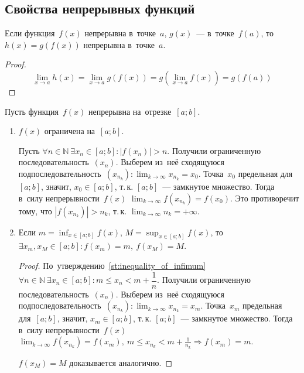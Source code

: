\subsection{Свойства непрерывных функций}
\begin{statement}
Если функция~$f(x)$ непрерывна в~точке~$a$, $g(x)$~--- в~точке~$f(a)$, то $h(x) = g(f(x))$ непрерывна в~точке~$a$.
\end{statement}
\begin{proof}
\begin{equation*}
\lim_{x \to a} h(x) = \lim_{x \to a} g(f(x)) = g(\lim_{x \to a} f(x)) = g(f(a))
\end{equation*}
\end{proof}

Пусть функция~$f(x)$ непрерывна на~отрезке~$[a; b]$.
\begin{enumerate}
	\item $f(x)$ ограничена на~$[a; b]$.
	\begin{proofcontra}
	Пусть $\forall n \in \mathbb N \ \exists x_n \in [a; b] \colon |f(x_n)| > n$.
	Получили ограниченную последовательность~$(x_n)$.
	Выберем из~неё сходящуюся подпоследовательность~$\displaystyle (x_{n_k}) \colon \lim_{k \to \infty} x_{n_k} = x_0$.
	Точка~$x_0$ предельная для~$[a; b]$, значит, $x_0 \in [a; b]$, т.\,к. $[a; b]$~--- замкнутое множество.
	Тогда в~силу непрерывности~$f(x)$ $\displaystyle \lim_{k \to \infty} f(x_{n_k}) = f(x_0)$.
	Это противоречит тому, что $|f(x_{n_k})| > n_k$, т.\,к. $\displaystyle \lim_{k \to \infty} n_k = +\infty$.
	\end{proofcontra}
	
	\item\label{st:continuous_function_takes_inf_and_sup} Если $\displaystyle m = \inf_{x \in [a; b]} f(x)$, $\displaystyle M = \sup_{x \in [a; b]} f(x)$, то $\exists x_m, x_M \in [a; b] \colon f(x_m) = m, \ f(x_M) = M$.
	\begin{proof}
	По~утверждению~\ref{st:inequality_of_infimum} $\forall n \in \mathbb N \ \exists x_n \in [a; b] \colon m \leqslant x_n < m + \dfrac1n$.
	Получили ограниченную последовательность~$(x_n)$.
	Выберем из~неё сходящуюся подпоследовательность~$\displaystyle (x_{n_k}) \colon \lim_{k \to \infty} x_{n_k} = x_m$.
	Точка~$x_m$ предельная для~$[a; b]$, значит, $x_m \in [a; b]$, т.\,к. $[a; b]$~--- замкнутое множество.
	Тогда в~силу непрерывности~$f(x)$ $\displaystyle \lim_{k \to \infty} f(x_{n_k}) = f(x_m), \ m \leqslant x_{n_k} < m + \frac1{n_k} \Rightarrow f(x_m) = m$.
	
	$f(x_M) = M$ доказывается аналогично.
	\end{proof}
	

\end{enumerate}
